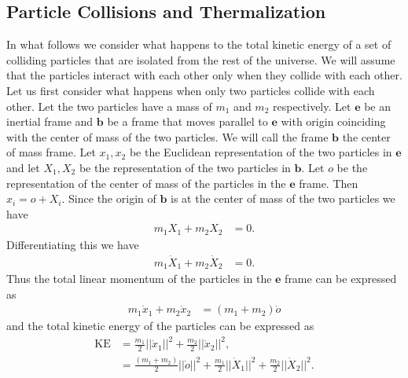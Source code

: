 \documentclass[graybox,envcountchap,sectrefs]{svmonoMuga}
\begin{document}
\subsection{Particle Collisions and Thermalization}
In what follows we consider what happens to the total kinetic energy of a set of colliding particles that are isolated from the rest of the universe. We will assume that the particles interact with each other only when they collide with each other.
Let us first consider what happens when only two particles collide with each other. Let the two particles have a mass of $m_1$ and $m_2$ respectively. Let $\mathbf{e}$ be an inertial frame and $\mathbf{b}$ be a frame that moves parallel to $\mathbf{e}$ with origin coinciding with the center of mass of the two particles. We will call the frame $\mathbf{b}$ the center of mass frame. Let $x_1, x_2$ be the Euclidean representation of the two particles in $\mathbf{e}$ and let $X_1,X_2$ be the representation of the two particles in $\mathbf{b}$. Let $o$ be the representation of the center of mass of the particles in the $\mathbf{e}$ frame. Then $x_i=o+X_i$.
Since the origin of $\mathbf{b}$ is at the center of mass of the two particles we have
\begin{align}
m_1X_1+m_2X_2 &=0.\label{eq:cmp1}
\end{align}
Differentiating this we have
\begin{align}
m_1\dot{X}_1+m_2\dot{X}_2&=0.\label{eq:cmv1}
\end{align}
Thus the 
total linear momentum of the particles in the $\mathbf{e}$ frame can be expressed as
\begin{align}
m_1\dot{x}_1+m_2\dot{x}_2&= (m_1+m_2)\dot{o}
\end{align}
and the total kinetic energy of the particles can be expressed as
\begin{align}
\mathrm{KE}&=\frac{m_1}{2}||\dot{x}_1||^2+\frac{m_2}{2}||\dot{x}_2||^2,\\
&=\frac{(m_1+m_2)}{2}||\dot{o}||^2+\frac{m_1}{2}||\dot{X}_1||^2+\frac{m_2}{2}||\dot{X}_2||^2.
\end{align}
\end{document}
